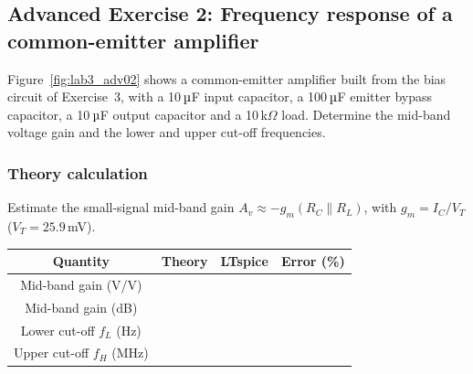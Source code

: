\subsection{Advanced Exercise 2: Frequency response of a common-emitter amplifier}
Figure~\ref{fig:lab3_adv02} shows a common-emitter amplifier built from the bias circuit of Exercise~3, with a 10\,$\micro$F input capacitor, a 100\,$\micro$F emitter bypass capacitor, a 10\,$\micro$F output capacitor and a 10\,k$\Omega$ load. Determine the mid-band voltage gain and the lower and upper cut-off frequencies.


\subsubsection{Theory calculation}\vspace{-3pt}\notesblock Estimate the small-signal mid-band gain $A_v\approx-g_m(R_C\parallel R_L)$, with $g_m=I_C/V_T$ ($V_T=25.9$\,mV).

\begin{center}\renewcommand{\arraystretch}{1.8}\begin{tabular}{|c|c|c|c|}\hline \textbf{Quantity} & \textbf{Theory} & \textbf{LTspice} & \textbf{Error (\%)}\\ \hline Mid-band gain (V/V) & & & \\ \hline Mid-band gain (dB) & & & \\ \hline Lower cut-off $f_L$ (Hz) & & & \\ \hline Upper cut-off $f_H$ (MHz) & & & \\ \hline \end{tabular}\end{center}
\newpage
